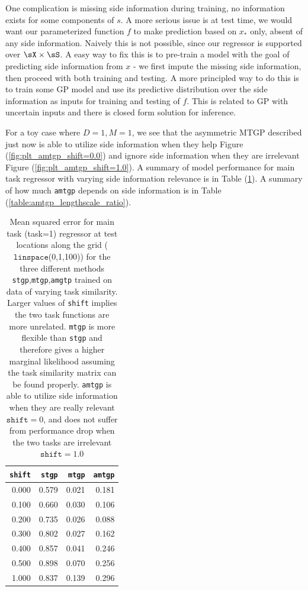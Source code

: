 \documentclass[11pt]{article}
\begin{document}
One complication is missing side information during training, no information exists for some components of $s$. A more serious issue is at test time, we would want our parameterized function $f$ to make prediction based on $x_*$ only, absent of any side information. Naively this is not possible, since our regressor is supported over $\sX\times\sS$. A easy way to fix this is to pre-train a model with the goal of predicting side information from $x$ - we first impute the missing side information, then proceed with both training and testing. A more principled way to do this is to train some GP model and use its predictive distribution over the side information as inputs for training and testing of $f$. This is related to GP with uncertain inputs and there is closed form solution for inference. 

For a toy case where $D=1,M=1$, we see that the asymmetric MTGP described just now is able to utilize side information when they help Figure (\ref{fig:plt_amtgp_shift=0.0}) and ignore side information when they are irrelevant Figure (\ref{fig:plt_amtgp_shift=1.0}). A summary of model performance for main task regressor with varying side information relevance is in Table (\ref{table:amtgp_mse_wrt_shift}). A summary of how much \texttt{amtgp} depends on side information is in Table (\ref{table:amtgp_lengthscale_ratio}). 

\begin{table}[h!]
\begin{center}
    \begin{tabular}{r|rrr}
        \texttt{shift} &  \texttt{stgp} &   \texttt{mtgp} &   \texttt{amtgp} \\
    \hline
        0.000 &  0.579 &  0.021 &   0.181 \\
        0.100 &  0.660 &  0.030 &   0.106 \\
        0.200 &  0.735 &  0.026 &   0.088 \\
        0.300 &  0.802 &  0.027 &   0.162 \\
        0.400 &  0.857 &  0.041 &   0.246 \\
        0.500 &  0.898 &  0.070 &   0.256 \\
        1.000 &  0.837 &  0.139 &   0.296 \\
    \end{tabular}
    \caption{Mean squared error for main task (task=1) regressor at test locations along the grid ($\texttt{linspace}$(0,1,100)) for the three different methods \texttt{stgp},\texttt{mtgp},\texttt{amgtp} trained on data of varying task similarity. Larger values of \texttt{shift} implies the two task functions are more unrelated. \texttt{mtgp} is more flexible than \texttt{stgp} and therefore gives a higher marginal likelihood assuming the task similarity matrix can be found properly. \texttt{amtgp} is able to utilize side information when they are really relevant $\texttt{shift}=0$, and does not suffer from performance drop when the two tasks are irrelevant $\texttt{shift}=1.0$ }
    \label{table:amtgp_mse_wrt_shift}
\end{center}
\end{table}
\end{document}
